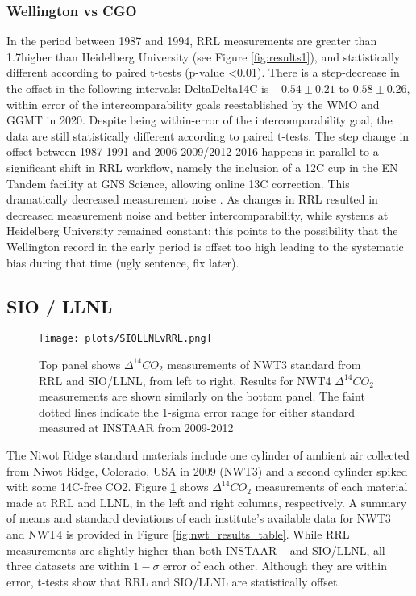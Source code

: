 \subsubsection{Wellington vs CGO}
\label{WellingtonvCGO}
In the period between 1987 and 1994, RRL measurements are  greater than 1.7\textperthousand higher than Heidelberg University (see Figure \ref{fig:results1}), and statistically different according to paired t-tests (p-value <0.01). 
There is a step-decrease in the offset in the following intervals: DeltaDelta14C is $-0.54\pm0.21$ to $0.58\pm0.26$, within error of the intercomparability goals reestablished by the WMO and GGMT in 2020. Despite being within-error of the intercomparability goal, the data are still statistically different according to paired t-tests. 
The step change in offset between 1987-1991 and 2006-2009/2012-2016 happens in parallel to a significant shift in RRL workflow, namely the inclusion of a 12C cup in the EN Tandem facility at GNS Science, allowing online 13C correction. This dramatically decreased measurement noise \cite{turnbull2017}.
As changes in RRL resulted in decreased measurement noise and better intercomparability, while systems at Heidelberg University remained constant; this points to the possibility that the Wellington record in the early period is offset too high leading to the systematic bias during that time (ugly sentence, fix later). 


\subsection{SIO / LLNL}
\begin{figure}[h!]
  \texttt{[image: plots/SIOLLNLvRRL.png]}
  \caption{Top panel shows ${\Delta^{14}CO_{2}}$ measurements of NWT3 standard from RRL and SIO/LLNL, from left to right. Results for NWT4 ${\Delta^{14}CO_{2}}$ measurements are shown similarly on the bottom panel. The faint dotted lines indicate the 1-sigma error range for either standard measured at INSTAAR from 2009-2012}
  \label{fig:siollnl}
\end{figure}

The Niwot Ridge standard materials include one cylinder of ambient air collected from Niwot Ridge, Colorado, USA in 2009 (NWT3) and a second cylinder spiked with some 14C-free CO2. Figure \ref{fig:siollnl} shows ${\Delta^{14}CO_{2}}$ measurements of each material made at RRL and LLNL, in the left and right columns, respectively. A summary of means and standard deviations of each institute's available data for NWT3 and NWT4 is provided in Figure \ref{fig:nwt_results_table}.
While RRL measurements are slightly higher than both INSTAAR ~\cite{lehman2013allocation} and SIO/LLNL, all three datasets are within $1-\sigma$ error of each other. Although they are within error, t-tests show that RRL and SIO/LLNL are statistically offset. 


